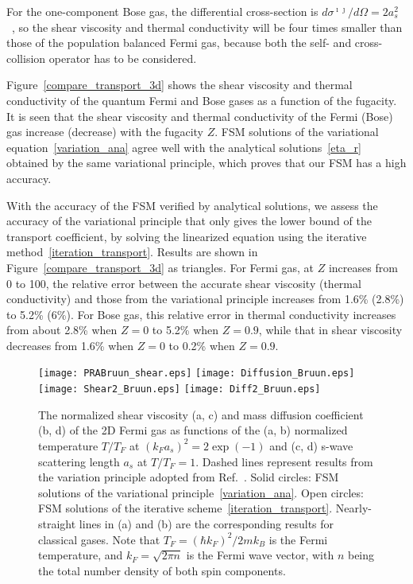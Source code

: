 For the one-component Bose gas, the differential cross-section is ${d\sigma^{\imath\jmath}}/{d\Omega}=2a_s^2$~\cite{Nikuni1998}, so the shear viscosity and thermal conductivity will be four times smaller than those of the population balanced Fermi gas, because both the self- and cross-collision operator has to be considered.


Figure~\ref{compare_transport_3d} shows the shear viscosity and thermal conductivity of the quantum Fermi and Bose gases as a function of the fugacity. It is seen that the shear viscosity and thermal conductivity of the Fermi (Bose) gas increase (decrease) with the fugacity $Z$.  FSM solutions of the variational equation~\eqref{variation_ana} agree well with the analytical solutions~\eqref{eta_r} obtained by the same variational principle, which proves that our FSM has a high accuracy. 


With the accuracy of the FSM verified by  analytical solutions, we assess the accuracy of the variational principle that only gives the lower bound of the transport coefficient, by solving the linearized equation using the iterative method~\eqref{iteration_transport}. Results are shown in Figure~\ref{compare_transport_3d} as triangles. For Fermi gas, at $Z$ increases from 0 to 100, the relative error between the accurate shear viscosity (thermal conductivity) and those from the variational principle increases from 1.6\% (2.8\%) to 5.2\% (6\%).  For Bose gas, this relative error in thermal conductivity increases  from about 2.8\% when $Z=0$ to 5.2\% when $Z=0.9$, while that in shear viscosity decreases from 1.6\% when $Z=0$ to 0.2\% when $Z=0.9$. 




\begin{figure}[t]
	\centering
	\texttt{[image: PRABruun\_shear.eps]}
	\hskip 0.5cm
	\texttt{[image: Diffusion\_Bruun.eps]}\\
	\vskip 0.5cm
	\texttt{[image: Shear2\_Bruun.eps]}
	\hskip 0.5cm
	\texttt{[image: Diff2\_Bruun.eps]}
	\caption{The normalized shear viscosity (a, c) and mass diffusion coefficient (b, d) of the 2D Fermi gas as  functions of the (a, b) normalized temperature $T/T_F$ at $(k_Fa_s)^2={2\exp(-1)}$ and (c, d) s-wave scattering length $a_s$ at $T/T_F=1$. Dashed lines represent results from the variation principle adopted from Ref.~\cite{bruun_2012}. Solid circles: FSM solutions of the variational principle~\eqref{variation_ana}. Open circles: FSM solutions of the iterative scheme~\eqref{iteration_transport}. Nearly-straight lines in (a) and (b) are the corresponding results for classical gases. Note that $T_F=(\hbar{k_F})^2/2mk_B$ is the Fermi temperature, and  $k_F=\sqrt{2\pi{n}}$ is the Fermi wave vector, with $n$ being the total number density of both spin components.}\label{shear_2d}
\end{figure}






